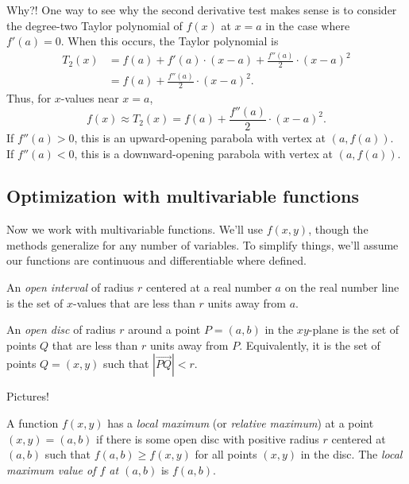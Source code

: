 Why?! One way to see why the second derivative test makes sense is to consider the degree-two Taylor polynomial of $f(x)$ at $x=a$ in the case where $f'(a)=0$. When this occurs, the Taylor polynomial is
\begin{align*} 
    T_2(x) 
    &= f(a) + f'(a)\cdot(x-a)+\frac{f''(a)}{2}\cdot(x-a)^2 \\
    & = f(a) + \frac{f''(a)}{2}\cdot(x-a)^2.
\end{align*}
Thus, for $x$-values near $x=a$, 
\[
    f(x)\approx T_2(x)=f(a)+\frac{f''(a)}{2}\cdot(x-a)^2.
\]
If $f''(a)>0$, this is an upward-opening parabola with vertex at $(a,f(a))$. \\ 
If $f''(a)<0$, this is a downward-opening parabola with vertex at $(a,f(a))$.
\pagebreak 

\subsection{Optimization with multivariable functions}
Now we work with multivariable functions. We'll use $f(x,y)$, though the methods generalize for any number of variables. To simplify things, we'll assume our functions are continuous and differentiable where defined.
\begin{defn}
    An \emph{open interval} of radius $r$ centered at a real number $a$ on the real number line is the set of $x$-values that are less than $r$ units away from $a$. 
\end{defn}

\begin{defn}
    An \emph{open disc} of radius $r$ around a point $P=(a,b)$ in the $xy$-plane is the set of points $Q$ that are less than $r$ units away from $P$. Equivalently, it is the set of points $Q=(x,y)$ such that $|\vec{PQ}|<r$.
\end{defn}

\begin{ex}
    Pictures!
\end{ex}

\vspace{1.5in}

\begin{defn}
    A function $f(x,y)$ has a \emph{local maximum} (or \emph{relative maximum}) at a point $(x,y)=(a,b)$ if there is some open disc with positive radius $r$ centered at $(a,b)$ such that $f(a,b)\ge f(x,y)$ for all points $(x,y)$ in the disc. The \emph{local maximum value of $f$ at $(a,b)$} is $f(a,b)$.
\end{defn}

